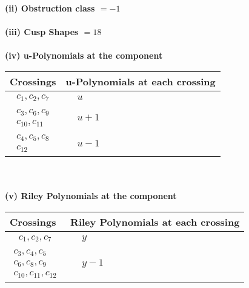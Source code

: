 \documentclass[1p]{elsarticle_modified}
\theoremstyle{definition}
\begin{document}
\flushleft \textbf{(ii) Obstruction class $= -1$}\\~\\
\flushleft \textbf{(iii) Cusp Shapes $= 18$}\\~\\
\newpage\renewcommand{\arraystretch}{1}
\flushleft \textbf{(iv) u-Polynomials at the component}\newline \\
\begin{tabular}{m{50pt}|m{274pt}}
Crossings & \hspace{64pt}u-Polynomials at each crossing \\
\hline $$\begin{aligned}c_{1},c_{2},c_{7}\end{aligned}$$&$\begin{aligned}
&u
\end{aligned}$\\
\hline $$\begin{aligned}c_{3},c_{6},c_{9}\\c_{10},c_{11}\end{aligned}$$&$\begin{aligned}
&u+1
\end{aligned}$\\
\hline $$\begin{aligned}c_{4},c_{5},c_{8}\\c_{12}\end{aligned}$$&$\begin{aligned}
&u-1
\end{aligned}$\\
\hline
\end{tabular}\\~\\
\newpage\renewcommand{\arraystretch}{1}
\flushleft \textbf{(v) Riley Polynomials at the component}\newline \\
\begin{tabular}{m{50pt}|m{274pt}}
Crossings & \hspace{64pt}Riley Polynomials at each crossing \\
\hline $$\begin{aligned}c_{1},c_{2},c_{7}\end{aligned}$$&$\begin{aligned}
&y
\end{aligned}$\\
\hline $$\begin{aligned}c_{3},c_{4},c_{5}\\c_{6},c_{8},c_{9}\\c_{10},c_{11},c_{12}\end{aligned}$$&$\begin{aligned}
&y-1
\end{aligned}$\\
\hline
\end{tabular}\\~\\
\end{document}
